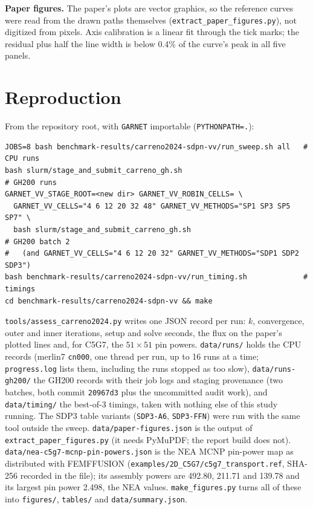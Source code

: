 \documentclass[a4paper,10pt]{article}
\newcommand{\garnet}{\texttt{GARNET}}
\newcommand{\code}[1]{\texttt{#1}}
\begin{document}
\textbf{Paper figures.} The paper's plots are vector graphics, so the
reference curves were read from the drawn paths themselves
(\code{extract\_paper\_figures.py}), not digitized from pixels. Axis
calibration is a linear fit through the tick marks; the residual plus half
the line width is below 0.4\% of the curve's peak in all five panels.





\clearpage




\appendix
\section{Reproduction}

From the repository root, with \garnet{} importable (\code{PYTHONPATH=.}):

\begin{verbatim}
JOBS=8 bash benchmark-results/carreno2024-sdpn-vv/run_sweep.sh all   # CPU runs
bash slurm/stage_and_submit_carreno_gh.sh                             # GH200 runs
GARNET_VV_STAGE_ROOT=<new dir> GARNET_VV_ROBIN_CELLS= \
  GARNET_VV_CELLS="4 6 12 20 32 48" GARNET_VV_METHODS="SP1 SP3 SP5 SP7" \
  bash slurm/stage_and_submit_carreno_gh.sh                           # GH200 batch 2
#   (and GARNET_VV_CELLS="4 6 12 20 32" GARNET_VV_METHODS="SDP1 SDP2 SDP3")
bash benchmark-results/carreno2024-sdpn-vv/run_timing.sh             # timings
cd benchmark-results/carreno2024-sdpn-vv && make
\end{verbatim}

\code{tools/assess\_carreno2024.py} writes one JSON record per run: $k$,
convergence, outer and inner iterations, setup and solve seconds, the flux
on the paper's plotted lines and, for C5G7, the $51 \times 51$ pin powers.
\code{data/runs/} holds the CPU records (merlin7 \code{cn000}, one thread per
run, up to 16 runs at a time; \code{progress.log} lists them, including the
runs stopped as too slow), \code{data/runs-gh200/} the GH200 records with
their job logs and staging provenance (two batches, both commit
\code{20967d3} plus the uncommitted audit work), and \code{data/timing/} the
best-of-3 timings, taken with nothing else of this study running. The SDP3
table variants (\code{SDP3-A6}, \code{SDP3-FFN}) were run with the same tool
outside the sweep. \code{data/paper-figures.json} is
the output of \code{extract\_paper\_figures.py} (it needs PyMuPDF; the
report build does not). \code{data/nea-c5g7-mcnp-pin-powers.json} is the
NEA MCNP pin-power map as distributed with FEMFFUSION
(\code{examples/2D\_C5G7/c5g7\_transport.ref}, SHA-256 recorded in the
file); its assembly powers are 492.80, 211.71 and 139.78 and its largest pin
power 2.498, the NEA values. \code{make\_figures.py} turns all of these into
\code{figures/}, \code{tables/} and \code{data/summary.json}.
\end{document}
